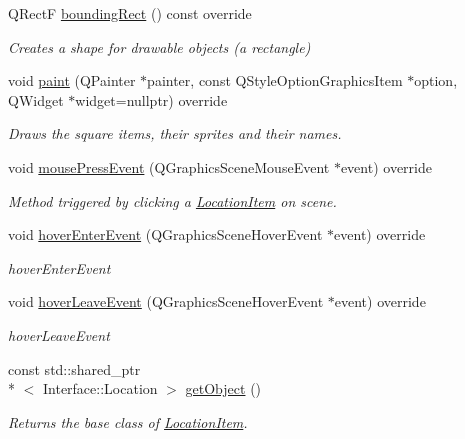 \begin{DoxyCompactItemize}
\item 
Q\-Rect\-F \hyperlink{class_location_item_a0c2e8a4c232ea4d02776b4692fb3cd9f}{bounding\-Rect} () const override
\begin{DoxyCompactList}\small\item\em Creates a shape for drawable objects (a rectangle) \end{DoxyCompactList}\item 
void \hyperlink{class_location_item_acf2aadefadabc9fcf37eacebc7df6b0d}{paint} (Q\-Painter $\ast$painter, const Q\-Style\-Option\-Graphics\-Item $\ast$option, Q\-Widget $\ast$widget=nullptr) override
\begin{DoxyCompactList}\small\item\em Draws the square items, their sprites and their names. \end{DoxyCompactList}\item 
void \hyperlink{class_location_item_aeaa18d3bcdfd3afe7364e47ad59ecc55}{mouse\-Press\-Event} (Q\-Graphics\-Scene\-Mouse\-Event $\ast$event) override
\begin{DoxyCompactList}\small\item\em Method triggered by clicking a \hyperlink{class_location_item}{Location\-Item} on scene. \end{DoxyCompactList}\item 
void \hyperlink{class_location_item_ab465252ded656215f4fb1db9174c2135}{hover\-Enter\-Event} (Q\-Graphics\-Scene\-Hover\-Event $\ast$event) override
\begin{DoxyCompactList}\small\item\em hover\-Enter\-Event \end{DoxyCompactList}\item 
void \hyperlink{class_location_item_a80ca01d3d5142e11699aa404b005cc9d}{hover\-Leave\-Event} (Q\-Graphics\-Scene\-Hover\-Event $\ast$event) override
\begin{DoxyCompactList}\small\item\em hover\-Leave\-Event \end{DoxyCompactList}\item 
const std\-::shared\-\_\-ptr\\*
$<$ Interface\-::\-Location $>$ \hyperlink{class_location_item_a6ea096d95f6a102ce0f186274dcfe870}{get\-Object} ()
\begin{DoxyCompactList}\small\item\em Returns the base class of \hyperlink{class_location_item}{Location\-Item}. \end{DoxyCompactList}\item 

\end{DoxyCompactItemize}
